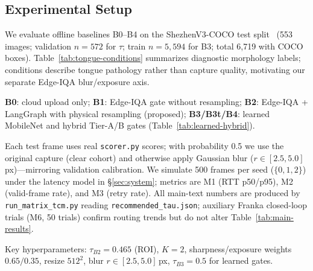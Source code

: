 \subsection{Experimental Setup}
\label{sec:setup}

We evaluate offline baselines B0--B4 on the ShezhenV3-COCO test split~\cite{zhang2020tongue} (553 images; validation $n{=}572$ for $\tau$; train $n{=}5{,}594$ for B3; total 6{,}719 with COCO boxes).
Table~\ref{tab:tongue-conditions} summarizes diagnostic morphology labels; conditions describe tongue pathology rather than capture quality, motivating our separate Edge-IQA blur/exposure axis.

\textbf{B0}: cloud upload only; \textbf{B1}: Edge-IQA gate without resampling; \textbf{B2}: Edge-IQA + LangGraph with physical resampling (proposed); \textbf{B3/B3t/B4}: learned MobileNet and hybrid Tier-A/B gates (Table~\ref{tab:learned-hybrid}).

Each test frame uses real \texttt{scorer.py} scores; with probability 0.5 we use the original capture (clear cohort) and otherwise apply Gaussian blur ($r\in[2.5,5.0]$\,px)---mirroring validation calibration.
We simulate 500 frames per seed ($\{0,1,2\}$) under the latency model in \S\ref{sec:system}; metrics are M1 (RTT p50/p95), M2 (valid-frame rate), and M3 (retry rate).
All main-text numbers are produced by \texttt{run\_matrix\_tcm.py} reading \texttt{recommended\_tau.json}; auxiliary Franka closed-loop trials (M6, 50 trials) confirm routing trends but do not alter Table~\ref{tab:main-results}.

Key hyperparameters: $\tau_{B2}{=}0.465$ (ROI), $K{=}2$, sharpness/exposure weights $0.65/0.35$, resize $512^2$, blur $r\in[2.5,5.0]$\,px, $\tau_{B3}{=}0.5$ for learned gates.
